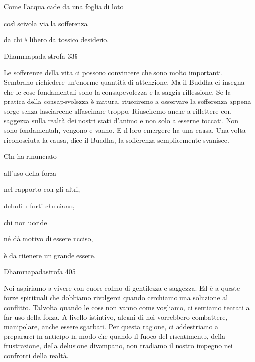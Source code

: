\documentclass[a4paper,portrait,12pt]{article}
\begin{document}
\newpage









Come l'acqua cade da una foglia di loto


così scivola via la sofferenza


da chi \`{e} libero da tossico desiderio.





Dhammapada strofa 336


\newpage



Le sofferenze della vita ci possono convincere che sono molto importanti. Sembrano richiedere un'enorme quantit\`{a} di attenzione. Ma il Buddha ci insegna che le cose fondamentali sono la consapevolezza e la saggia riflessione. Se la pratica della consapevolezza \`{e} matura, riusciremo a osservare la sofferenza appena sorge senza lasciarcene affascinare troppo. Riusciremo anche a riflettere con saggezza sulla realt\`{a} dei nostri stati d'animo e non solo a esserne toccati. Non sono fondamentali, vengono e vanno. E il loro emergere ha una causa. Una volta riconosciuta la causa, dice il Buddha, la sofferenza semplicemente svanisce. 





\newpage



Chi ha rinunciato


all'uso della forza


nel rapporto con gli altri, 


deboli o forti che siano,


chi non uccide


n\'{e} d\`{a} motivo di essere ucciso,


\`{e} da ritenere un grande essere.





Dhammapadastrofa 405


\newpage



Noi aspiriamo a vivere con cuore colmo di gentilezza e saggezza. Ed \`{e} a queste forze spirituali che dobbiamo rivolgerci quando cerchiamo una soluzione al conflitto. Talvolta quando le cose non vanno come vogliamo, ci sentiamo tentati a far uso della forza. A livello istintivo, alcuni di noi vorrebbero combattere, manipolare, anche essere sgarbati. Per questa ragione, ci addestriamo a prepararci in anticipo in modo che quando il fuoco del risentimento, della frustrazione, della delusione divampano, non tradiamo il nostro impegno nei confronti della realt\`{a}.
\end{document}
